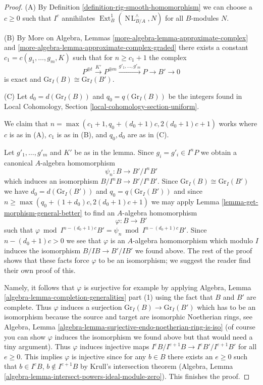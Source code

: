 \documentclass[10pt,a4paper]{amsart}
\theoremstyle{plain}
\theoremstyle{definition}
\theoremstyle{remark}
\numberwithin{equation}{subsection}
\def\Ext{\mathop{\mathrm{Ext}}\nolimits}
\def\NL{\mathop{N\!L}\nolimits}
\begin{document}
\begin{proof}
(A) By Definition \ref{definition-rig-smooth-homomorphism}
we can choose a $c \geq 0$ such that $I^c$ annihilates
$\Ext^1_B(\NL_{B/A}^\wedge, N)$ for all $B$-modules $N$.

\medskip\noindent
(B) By More on Algebra, Lemmas \ref{more-algebra-lemma-approximate-complex} and
\ref{more-algebra-lemma-approximate-complex-graded}
there exists a constant $c_1 = c(g_1, \ldots, g_m, K)$
such that for $n \geq c_1 + 1$ the complex
$$
P^{\oplus t} \xrightarrow{K'} P^{\oplus m}
\xrightarrow{g'_1, \ldots, g'_m} P \to B' \to 0
$$
is exact and $\text{Gr}_I(B) \cong \text{Gr}_I(B')$.

\medskip\noindent
(C) Let $d_0 = d(\text{Gr}_I(B))$ and $q_0 = q(\text{Gr}_I(B))$
be the integers found in
Local Cohomology, Section \ref{local-cohomology-section-uniform}.

\medskip\noindent
We claim that $n = \max(c_1 + 1, q_0 + (d_0 + 1)c, 2(d_0 + 1)c + 1)$
works where $c$ is as in (A), $c_1$ is as in (B), and $q_0, d_0$ are as
in (C).

\medskip\noindent
Let $g'_1, \ldots, g'_m$ and $K'$ be as in the lemma.
Since $g_i = g'_i \in I^nP$ we obtain a canonical
$A$-algebra homomorphism
$$
\psi_n : B \longrightarrow B'/I^nB'
$$
which induces an isomorphism $B/I^nB \to B'/I^nB'$. Since
$\text{Gr}_I(B) \cong \text{Gr}_I(B')$ we have
$d_0 = d(\text{Gr}_I(B'))$ and $q_0 = q(\text{Gr}_I(B'))$
and since $n \geq \max(q_0 + (1 + d_0)c, 2(d_0 + 1)c + 1)$
we may apply Lemma \ref{lemma-get-morphism-general-better}
to find an $A$-algebra homomorphism
$$
\varphi : B \longrightarrow B'
$$
such that
$\varphi \bmod I^{n - (d_0 + 1)c}B' = \psi_n \bmod I^{n - (d_0 + 1)c}B'$.
Since $n - (d_0 + 1)c > 0$ we see that $\varphi$ is an $A$-algebra
homomorphism which modulo $I$ induces the isomorphism $B/IB \to B'/IB'$
we found above.
The rest of the proof shows that these facts force $\varphi$
to be an isomorphism; we suggest the reader find their own proof of this.

\medskip\noindent
Namely, it follows that $\varphi$ is surjective for example by applying
Algebra, Lemma \ref{algebra-lemma-completion-generalities} part (1)
using the fact that $B$ and $B'$ are complete.
Thus $\varphi$ induces a surjection $\text{Gr}_I(B) \to \text{Gr}_I(B')$
which has to be an isomorphism because the source and target are
isomorphic Noetherian rings, see
Algebra, Lemma \ref{algebra-lemma-surjective-endo-noetherian-ring-is-iso}
(of course you can show $\varphi$ induces the isomorphism we found above
but that would need a tiny argument).
Thus $\varphi$ induces injective maps
$I^eB/I^{e + 1}B \to I^eB'/I^{e + 1}B'$ for all $e \geq 0$.
This implies $\varphi$ is injective since for any $b \in B$ there
exists an $e \geq 0$ such that $b \in I^eB$, $b \not \in I^{e + 1}B$
by Krull's intersection theorem (Algebra, Lemma
\ref{algebra-lemma-intersect-powers-ideal-module-zero}).
This finishes the proof.
\end{proof}
\end{document}
